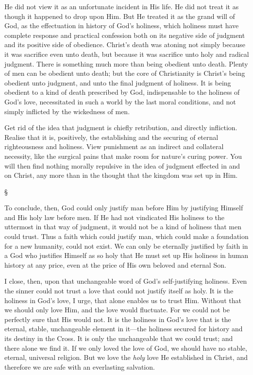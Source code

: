 \documentclass[12pt,letterpaper,oneside]{book}
\begin{document}
He did not view it as an unfortunate incident 
in His life. He did not treat it as though it 
happened to drop upon Him. But He treated 
it as the grand will of God, as the effectuation 
in history of God's holiness, which holiness 
must have complete response and practical 
confession both on its negative side of judgment 
and its positive side of obedience. Christ's 
death was atoning not simply because it was 
sacrifice even unto death, but because it was 
sacrifice unto holy and radical judgment. There 
is something much more than being obedient 
unto death. Plenty of men can be obedient unto 
death; but the core of Christianity is Christ's 
being obedient unto judgment, and unto the 
final judgment of holiness. It is being obedient 
to a kind of death prescribed by God, indispensable 
to the holiness of God's love, necessitated 
in such a world by the last moral conditions, and 
not simply inflicted by the wickedness of men. 

Get rid of the idea that judgment is chiefly 
retribution, and directly infliction. Realise that 
it is, positively, the establishing and the securing 
of eternal righteousness and holiness. View 
punishment as an indirect and collateral necessity, 
like the surgical pains that make room for 
nature's curing power. You will then find 
nothing morally repulsive in the idea of judgment
effected in and on Christ, any more than 
in the thought that the kingdom was set up 
in Him. 

\begin{center}
\S
\end{center}

To conclude, then, God could only justify man 
before Him by justifying Himself and His holy 
law before men. If He had not vindicated His 
holiness to the uttermost in that way of judgment, 
it would not be a kind of holiness that 
men could trust. Thus a faith which could 
justify man, which could make a foundation for 
a new humanity, could not exist. We can only 
be eternally justified by faith in a God who 
justifies Himself as so holy that He must set 
up His holiness in human history at any price, 
even at the price of His own beloved and 
eternal Son. 

I close, then, upon that unchangeable word of 
God's self-justifying holiness. Even the sinner 
could not trust a love that could not justify itself 
as holy. It is the holiness in God's love, I urge, 
that alone enables us to trust Him. Without 
that we should only love Him, and the love 
would fluctuate. For we could not be perfectly 
sure that His would not. It is the holiness in 
God's love that is the eternal, stable, unchangeable 
element in it---the holiness secured for 
history and its destiny in the Cross. It is only 
the unchangeable that we could trust; and 
there alone we find it. If we only loved the 
love of God, we should have no stable, eternal, 
universal religion. But we love the \textit{holy} love 
He established in Christ, and therefore we 
are safe with an everlasting salvation. 
\end{document}
